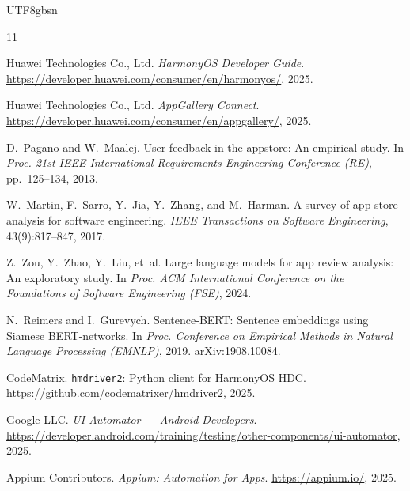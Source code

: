 \documentclass[11pt,a4paper]{article}
\begin{document}
\begin{CJK*}{UTF8}{gbsn}

\begin{thebibliography}{11}

Huawei Technologies Co., Ltd.
\newblock \textit{HarmonyOS Developer Guide}.
\newblock \url{https://developer.huawei.com/consumer/en/harmonyos/}, 2025.

Huawei Technologies Co., Ltd.
\newblock \textit{AppGallery Connect}.
\newblock \url{https://developer.huawei.com/consumer/en/appgallery/}, 2025.

D.~Pagano and W.~Maalej.
\newblock User feedback in the appstore: An empirical study.
\newblock In \textit{Proc. 21st IEEE International Requirements Engineering Conference (RE)}, pp.~125--134, 2013.

W.~Martin, F.~Sarro, Y.~Jia, Y.~Zhang, and M.~Harman.
\newblock A survey of app store analysis for software engineering.
\newblock \textit{IEEE Transactions on Software Engineering}, 43(9):817--847, 2017.

Z.~Zou, Y.~Zhao, Y.~Liu, et~al.
\newblock Large language models for app review analysis: An exploratory study.
\newblock In \textit{Proc. ACM International Conference on the Foundations of Software Engineering (FSE)}, 2024.

N.~Reimers and I.~Gurevych.
\newblock Sentence-BERT: Sentence embeddings using Siamese BERT-networks.
\newblock In \textit{Proc. Conference on Empirical Methods in Natural Language Processing (EMNLP)}, 2019.
\newblock arXiv:1908.10084.

CodeMatrix.
\newblock \texttt{hmdriver2}: Python client for HarmonyOS HDC.
\newblock \url{https://github.com/codematrixer/hmdriver2}, 2025.

Google LLC.
\newblock \textit{UI Automator --- Android Developers}.
\newblock \url{https://developer.android.com/training/testing/other-components/ui-automator}, 2025.

Appium Contributors.
\newblock \textit{Appium: Automation for Apps}.
\newblock \url{https://appium.io/}, 2025.

\end{thebibliography}

\end{CJK*}
\end{document}
